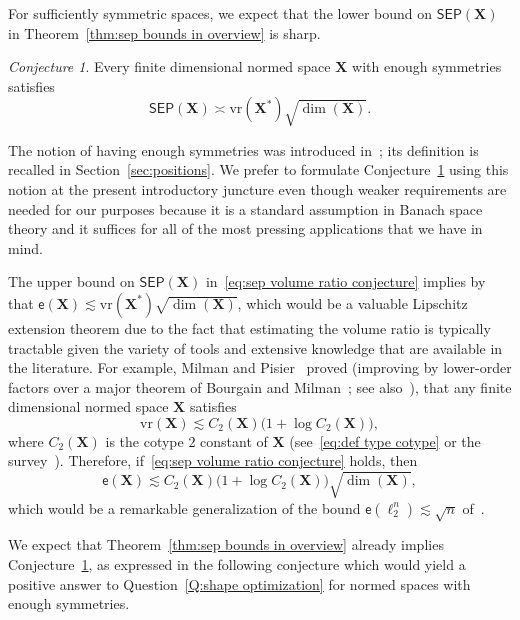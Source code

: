 \documentclass[11pt,reqno]{amsart}
\newcommand{\vr}{\mathrm{vr}}
\newcommand{\X}{\mathbf X}
\theoremstyle{remark}
\newtheorem{conjecture}[theorem]{Conjecture}
\newcommand{\ee}{\mathsf{e}}
\renewcommand{\1}{\mathbf 1}
\newcommand{\sep}{\mathsf{SEP}}
\begin{document}
For sufficiently symmetric spaces, we expect that the lower bound on $\sep(\X)$ in Theorem~\ref{thm:sep bounds in overview} is sharp.

\begin{conjecture}\label{conj:symmetric volume ratio sep} Every finite dimensional normed space $\X$ with enough symmetries satisfies
\begin{equation}\label{eq:sep volume ratio conjecture}
\sep(\X)\asymp \vr(\X^*) \sqrt{\dim(\X)}.
\end{equation}
\end{conjecture}

The notion of having enough symmetries was introduced in~\cite{GG71}; its definition is recalled in Section~\ref{sec:positions}. We prefer to formulate Conjecture~\ref{conj:symmetric volume ratio sep} using this  notion at the present introductory juncture even though weaker requirements are needed for our purposes because it is a standard assumption in Banach space theory and it suffices for all of the most pressing applications that we have in mind.

The upper bound on $\sep(\X)$ in~\eqref{eq:sep volume ratio conjecture} implies by~\cite{LN05} that $\ee(\X)\lesssim  \vr(\X^*) \sqrt{\dim(\X)}$, which would be a valuable Lipschitz extension theorem due to the fact that estimating the volume ratio is typically tractable given the variety of tools and extensive knowledge that are available in the literature. For example, Milman and Pisier~\cite{MP86} proved (improving by lower-order factors over a  major theorem of Bourgain and Milman~\cite{BM85,BM87}; see also~\cite{Mil87}), that any finite dimensional normed space $\X$ satisfies
\begin{equation}\label{eq:quoteMP}
\vr(\X)\lesssim  C_2(\X)\big(1+\log C_2(\X)\big),
\end{equation}
where $C_2(\X)$ is the cotype $2$ constant of $\X$ (see~\eqref{eq:def type cotype} or the survey~\cite{Mau03}). Therefore, if~\eqref{eq:sep volume ratio conjecture} holds, then
\begin{equation}\label{eq:ee cotype}
\ee(\X)\lesssim C_2(\X)\big(1+\log C_2(\X)\big)\sqrt{\dim(\X)},
\end{equation}
which would be a remarkable generalization of the bound $\ee(\ell_2^n)\lesssim \sqrt{n}$ of~\cite{LN05}.


We expect that Theorem~\ref{thm:sep bounds in overview} already implies Conjecture~\ref{conj:symmetric volume ratio sep}, as expressed in the following conjecture which would yield a positive  answer to Question~\ref{Q:shape optimization}  for normed spaces with enough symmetries.
\end{document}
